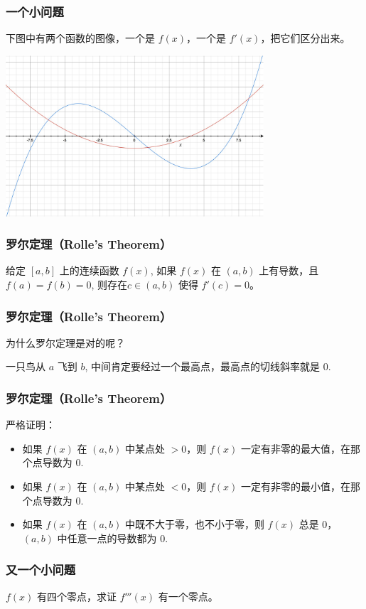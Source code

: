 \documentclass[CJK]{beamer}
\begin{document}
\begin{frame}
\frametitle{一个小问题}
下图中有两个函数的图像，一个是 $f(x)$，一个是 $f'(x)$，把它们区分出来。
\begin{center}
\includegraphics[height=6cm]{graph7.jpeg}
\end{center}
\end{frame}


\begin{frame}
\frametitle{罗尔定理（Rolle's Theorem）}
给定 $[a,b]$ 上的连续函数 $f(x)$, 如果 $f(x)$ 在 $(a,b)$ 上有导数，且 $f(a) = f(b) = 0$, 则存在$c\in(a,b)$ 使得 $f'(c) = 0$。
\end{frame}

\begin{frame}
\frametitle{罗尔定理（Rolle's Theorem）}
为什么罗尔定理是对的呢？

一只鸟从 $a$ 飞到 $b$, 中间肯定要经过一个\alert{最高点}，最高点的切线斜率就是 $0$.
\end{frame}

\begin{frame}
\frametitle{罗尔定理（Rolle's Theorem）}
严格证明：
\begin{itemize}
	\item 如果 $f(x)$ 在 $(a, b)$ 中某点处 $> 0$，则 $f(x)$ 一定有非零的\alert{最大值}，在那个点导数为 $0$.
	\item 如果 $f(x)$ 在 $(a, b)$ 中某点处 $< 0$，则 $f(x)$ 一定有非零的\alert{最小值}，在那个点导数为 $0$.
	\item 如果 $f(x)$ 在 $(a, b)$ 中既不大于零，也不小于零，则 $f(x)$ \alert{总是} $0$，$(a, b)$ 中任意一点的导数都为 $0$.
\end{itemize}
\end{frame}

\begin{frame}
\frametitle{又一个小问题}
$f(x)$ 有四个零点，求证 $f'''(x)$ 有一个零点。
\end{frame}
\end{document}
